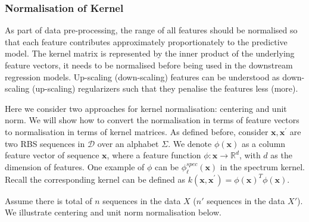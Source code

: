 \documentclass{scrartcl}[2013/05/29]%
\begin{document}

\subsubsection{Normalisation of Kernel}
\label{supp: Normalisation of Kernel}

As part of data pre-processing,
the range of all features should be normalised so that each feature contributes approximately proportionately to the predictive model. 
The kernel matrix is represented by the inner product of the underlying feature vectors, it needs to be normalised before being used in the downstream regression models. 
Up-scaling (down-scaling) features can be understood as down-scaling (up-scaling) regularizers such that they penalise the features less (more). 

Here we consider two approaches for kernel normalisation: centering and unit norm. 
We will show how to convert the normalisation in terms of feature vectors to normalisation in terms of kernel matrices. 
As defined before, consider $\mathbf{x}, \mathbf{x}^\prime$ are two RBS sequences in $\mathcal{D}$ over an alphabet $\Sigma$.
We denote $\phi(\mathbf{x})$ as a column feature vector of sequence $\mathbf{x}$, 
where a feature function $\phi: \mathbf{x} \rightarrow \mathbb{R}^d$,
with $d$ as the dimension of features.
One example of $\phi$ can be $\phi_\ell^{spec}(\mathbf{x})$ in the spectrum kernel.
Recall the corresponding kernel can be defined as $k(\mathbf{x}, \mathbf{x}^\prime) = \phi(\mathbf{x})^T \phi(\mathbf{x}).$

Assume there is total of $n$ sequences in the data $X$ ($n'$ sequences in the data $X'$). 
We illustrate centering and unit norm normalisation below. 
\end{document}
